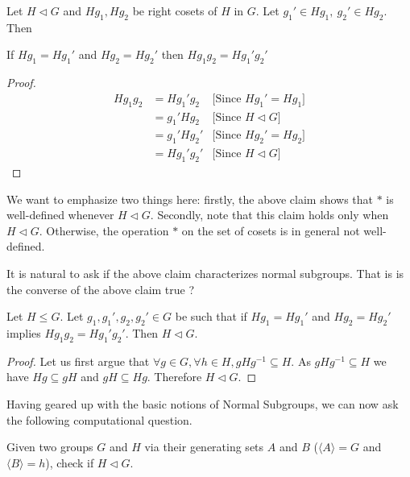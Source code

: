 \begin{claim}
Let $H\triangleleft G$ and $Hg_1,Hg_2$ be right cosets of $H$ in $G$. Let $g_1'\in Hg_1,~g_2'\in Hg_2$. Then 
\begin{center}
If $Hg_1=Hg_1'$ and $Hg_2=Hg_2'$ then $Hg_1g_2 = Hg_1'g_2' $
\end{center} 
\end{claim}
\begin{proof}
\begin{eqnarray*}
Hg_1g_2 &= Hg_1'g_2  & \text{[Since $Hg_1'= Hg_1$]}\\
&= g_1'Hg_2 & \text{[Since $H\triangleleft G$]}\\
&= g_1'Hg_2' & \text{[Since $Hg_2'= Hg_2$]}\\
&= Hg_1'g_2' & \text{[Since $H\triangleleft G$]}
\end{eqnarray*}
\end{proof}

We want to emphasize two things here: firstly, the above claim shows that $*$ is well-defined whenever $H\triangleleft G$. Secondly, note that this claim holds only when $H\triangleleft G$. Otherwise, the operation $*$ on the set of cosets is in general not well-defined. 

It is natural to ask if the above claim characterizes normal subgroups. That is is the converse of the above claim true ? 

\begin{claim}
Let $H\leq G$. Let $g_1,g_1',g_2,g_2'\in G$ be such that if $Hg_1=Hg_1'$ and $Hg_2=Hg_2'$ implies $Hg_1g_2 = Hg_1'g_2'$. Then $H\triangleleft G$.
\end{claim}
\begin{proof}
Let us first argue that $\forall g\in G,\forall h\in H, gHg^{-1}\subseteq H$.
As $gHg^{-1}\subseteq H$ we have $Hg\subseteq gH$ and $gH\subseteq Hg$. Therefore $H\triangleleft G$.
\end{proof}
Having geared up with the basic notions of Normal Subgroups, we can now ask the following computational question.
\begin{problem}\label{2}
	Given two groups $G$ and $H$ via their generating sets $A$ and $B$ ($\langle A\rangle=G$ and $\langle B\rangle=h$), check if $H\triangleleft G$.
\end{problem}
